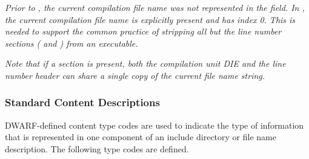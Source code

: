 \begin{enumerate}[1. ]
\textit{Prior to \DWARFVersionV, the current compilation 
file name was not represented in the 
field. In \DWARFVersionV, the current compilation file name 
is explicitly present and has index 0. This is needed to support 
the common practice of stripping all but the line number sections
(\dotdebugline{} and \dotdebuglinestr) from an executable.}

\textit{Note that if a \dotdebuglinestr{} section is present, 
both the compilation unit DIE and the line number header can
share a single copy of the current file name string.}

\end{enumerate}

\subsubsection{Standard Content Descriptions}
DWARF-defined content type codes are used to indicate
the type of information that is represented in one
component of an include directory or file name description.
The following type codes are defined.
